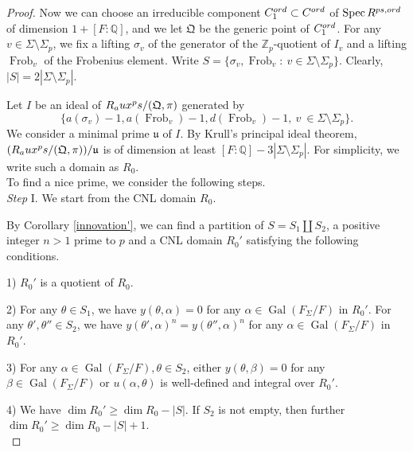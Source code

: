 \documentclass[12pt]{amsart}
\theoremstyle{plain}
\theoremstyle{definition}
\theoremstyle{remark}
\begin{document}
\begin{proof}
	
	
	Now we can choose an irreducible component $C_1^{\textnormal{ord}} \subset C^{\textnormal{ord}}$ of $\operatorname{Spec} R^{\textnormal{ps,ord}}$ of dimension $1+[F: \mathbb{Q}]$, and we let $\mathfrak{Q}$ be the generic point of $C_1^{\textnormal{ord}}$. For any $v \in \Sigma \setminus \Sigma_p$, we fix a lifting $\sigma_v $ of the generator of the $\mathbb{Z}_p$-quotient of $I_v$ and a lifting $\operatorname{Frob}_v$ of the Frobenius element. Write $S=\{\sigma_v, \operatorname{Frob}_v:~v \in \Sigma \setminus \Sigma_p\}$. Clearly, $|S|=2|\Sigma \setminus \Sigma_p|$.
	
	Let $I$ be an ideal of $R_\textnormal{aux}^\textnormal{ps}/(\mathfrak{Q}, \pi)$ generated by $$\{a(\sigma_{v})-1, a(\operatorname{Frob}_{v})-1, d(\operatorname{Frob}_{v})-1,~ v\ \in \Sigma \setminus \Sigma_p\}.$$ 
	We consider a minimal prime $\mathfrak{u}$ of $I$. By Krull's principal ideal theorem, $(R_\textnormal{aux}^\textnormal{ps}/(\mathfrak{Q}, \pi))/\mathfrak{u}$ is of dimension at least $[F: \mathbb{Q}]-3|\Sigma \setminus \Sigma_p|$. For simplicity, we write such a domain as $R_0$.\\
	
	To find a nice prime, we consider the following steps.\\
	
	\textit{Step} I. We start from the CNL domain $R_0$.
	
	By Corollary \ref{innovation'}, we can find a partition of $S = S_1 \amalg S_2$, a positive integer $n>1$ prime to $p$ and a CNL domain $R_0'$ satisfying the following conditions.
	
	1) $R_0'$ is a quotient of $R_0$.
	
	2) For any $\theta \in S_1$, we have $y(\theta, \alpha)=0$ for any $\alpha \in \operatorname{Gal}(F_\Sigma/F)$ in $R_0'$. For any $\theta', \theta'' \in S_2$, we have $y(\theta', \alpha)^n=y(\theta'', \alpha)^n$ for any $\alpha \in \operatorname{Gal}(F_\Sigma/F)$ in $R_0'$.
	
	3) For any $\alpha \in \operatorname{Gal}(F_\Sigma/F), \theta \in S_2$, either $ y(\theta, \beta)=0$ for any $\beta \in \operatorname{Gal}(F_\Sigma/F)$ or $u(\alpha, \theta)$ is well-defined and integral over $R_0'$.
	
	4) We have $\operatorname{dim} R_0' \ge \operatorname{dim} R_0 - |S|$. If $S_2$ is not empty, then further $\operatorname{dim} R_0' \ge \operatorname{dim} R_0 - |S|+1$.\\
	

\end{proof}
\end{document}
